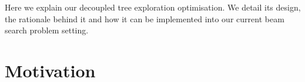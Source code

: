 \documentclass[11pt,twoside]{report}
\begin{document}

Here we explain our decoupled tree exploration optimisation.
We detail its design, the rationale behind it and how it can be implemented into our current beam search problem setting.

\section{Motivation}

\end{document}
